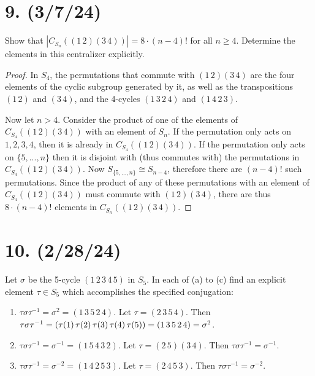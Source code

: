 \documentclass{article}
\begin{document}



\section*{9. (3/7/24)}

Show that $|C_{S_n}((1\,2)(3\,4))| = 8 \cdot (n - 4)!$ for all $n \geq 4$. Determine the elements in this centralizer explicitly.

\begin{proof}
    In $S_4$, the permutations that commute with $(1\,2)(3\,4)$ are the four elements of the cyclic subgroup generated by it, as well as the transpositions $(1\,2)$ and $(3\,4)$, and the 4-cycles $(1\,3\,2\,4)$ and $(1\,4\,2\,3)$.

    Now let $n > 4$. Consider the product of one of the elements of $C_{S_4}((1\,2)(3\,4))$ with an element of $S_{n}$. If the permutation only acts on ${1, 2, 3, 4}$, then it is already in $C_{S_4}((1\,2)(3\,4))$. If the permutation only acts on $\{ 5, ..., n \}$ then it is disjoint with (thus commutes with) the permutations in $C_{S_4}((1\,2)(3\,4))$. Now $S_{\{5, ..., n\}} \cong S_{n - 4}$, therefore there are $(n - 4)!$ such permutations. Since the product of any of these permutations with an element of $C_{S_4}((1\,2)(3\,4))$ must commute with $(1\,2)(3\,4)$, there are thus $8 \cdot (n - 4)!$ elements in $C_{S_n}((1\,2)(3\,4))$.
\end{proof}

\section*{10. (2/28/24)}

Let $\sigma$ be the 5-cycle $(1\, 2\, 3\, 4\, 5)$ in $S_5$. In each of (a) to (c) find an explicit element $\tau \in S_5$ which accomplishes the specified conjugation:

\begin{enumerate}[label=(\alph*), itemsep=0em]
    \item $\tau \sigma \tau^{-1} = \sigma^2 = (1\, 3\, 5\, 2\, 4)$. Let $\tau = (2\, 3\, 5\, 4)$. Then $\tau \sigma \tau^{-1} = \\ (\tau(1)\, \tau(2)\, \tau(3)\, \tau(4)\, \tau(5)) = (1\, 3\, 5\, 2\, 4) = \sigma^2$.
    \item $\tau \sigma \tau^{-1} = \sigma^{-1} = (1\, 5\, 4\, 3\, 2)$. Let $\tau = (2\, 5)(3\, 4)$. Then $\tau \sigma \tau^{-1} = \sigma^{-1}$.
    \item $\tau \sigma \tau^{-1} = \sigma^{-2} = (1\, 4\, 2\, 5\, 3)$. Let $\tau = (2\, 4\, 5\, 3)$. Then $\tau \sigma \tau^{-1} = \sigma^{-2}$.
\end{enumerate}
\end{document}
